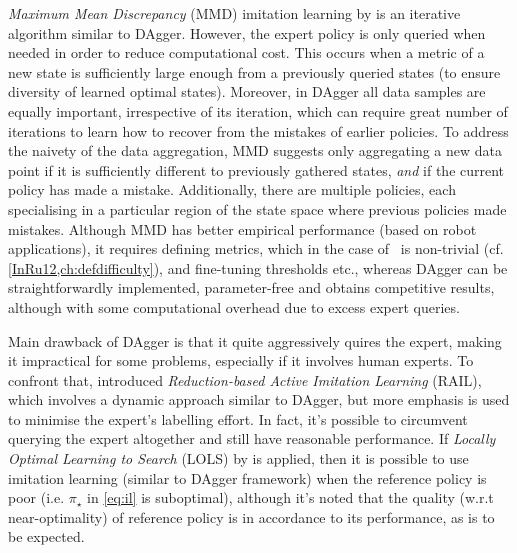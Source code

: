 \emph{Maximum Mean Discrepancy} (MMD) imitation learning by \cite{Kim13} is an 
iterative algorithm similar to DAgger. 
However, the expert policy is only queried when needed in order to reduce 
computational cost. 
This occurs when a metric of a new state is sufficiently large enough from a 
previously queried states (to ensure diversity of learned optimal states). 
Moreover, in DAgger all data samples are equally important, irrespective of its 
iteration, which can require great number of iterations to learn how to recover 
from the mistakes of earlier policies. To address the naivety of the data 
aggregation, MMD suggests only aggregating a new data point 
if it is sufficiently different to previously gathered states, \emph{and} if 
the current policy has made a mistake. 
Additionally, there are multiple policies, each specialising in a particular 
region of the state space where previous policies made mistakes.
Although MMD has better empirical performance (based on robot applications), it 
requires defining metrics, which in the case of \jsp\ is non-trivial (cf. 
\cref{InRu12,ch:defdifficulty}), and fine-tuning thresholds etc., whereas 
DAgger can be straightforwardly implemented, parameter-free and obtains 
competitive results, although with some computational overhead due to excess 
expert queries. 

Main drawback of DAgger is that it quite aggressively quires the expert, making 
it impractical for some problems, especially if it involves human experts. 
To confront that, \cite{Judah12} introduced \emph{Reduction-based Active 
Imitation Learning} (RAIL), which involves a dynamic approach similar to 
DAgger, but more emphasis is used to minimise the expert's labelling effort.
In fact, it's possible to circumvent querying the expert altogether and still 
have reasonable performance. If \emph{Locally Optimal Learning to 
Search} (LOLS) by \cite{ChangKADL15} is applied, then it is possible to use 
imitation learning (similar to DAgger framework) when the reference policy is 
poor (i.e. $\pi_\star$ in \cref{eq:il} is suboptimal), 
although it's noted that the quality (w.r.t near-optimality) of reference 
policy is in accordance to its performance, as is to be expected. 
